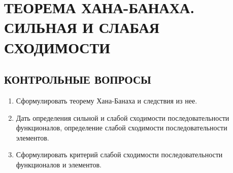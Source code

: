 \documentclass[12pt,a4paper]{article}
\begin{document}
\section{ТЕОРЕМА ХАНА-БАНАХА. СИЛЬНАЯ И СЛАБАЯ СХОДИМОСТИ}

\subsection*{КОНТРОЛЬНЫЕ ВОПРОСЫ}
\begin{enumerate}
\item Сформулировать теорему Хана-Банаха и следствия из нее.
\item Дать определения сильной и слабой сходимости последовательности функционалов, определение слабой сходимости последовательности элементов.
\item Сформулировать критерий слабой сходимости последовательности функционалов и элементов.
\end{enumerate}
\end{document}

